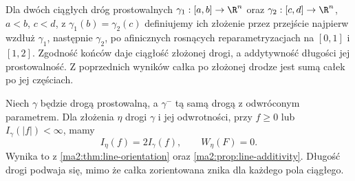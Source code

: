 Dla dwóch ciągłych dróg prostowalnych
$\gamma_1:[a,b]\to\R^n$ oraz
$\gamma_2:[c,d]\to\R^n$, $a<b$, $c<d$, z
$\gamma_1(b)=\gamma_2(c)$ definiujemy
ich złożenie przez przejście najpierw
wzdłuż $\gamma_1$, następnie $\gamma_2$,
po afinicznych rosnących reparametryzacjach
na $[0,1]$ i $[1,2]$. Zgodność końców daje
ciągłość złożonej drogi, a addytywność długości
jej prostowalność. Z poprzednich wyników całka po złożonej
drodze jest sumą całek po jej częściach.

\begin{przyklad}
\label{ma2:ex:line-backtrack}
Niech $\gamma$ będzie drogą prostowalną,
a $\gamma^{-}$ tą samą drogą z odwróconym
parametrem. Dla złożenia $\eta$ drogi $\gamma$
i jej odwrotności, przy $f\ge0$ lub
$I_\gamma(|f|)<\infty$, mamy
\[
 I_\eta(f)=2I_\gamma(f),\qquad W_\eta(F)=0.
\]
Wynika to z \ref{ma2:thm:line-orientation}
oraz \ref{ma2:prop:line-additivity}.
Długość drogi podwaja się, mimo że całka
zorientowana znika dla każdego pola ciągłego.
\end{przyklad}

